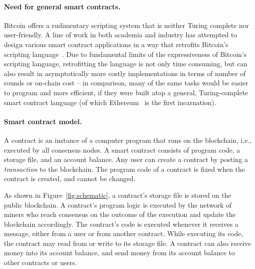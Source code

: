 \documentclass{llncs}
\begin{document}
\paragraph{Need for general smart contracts.}
Bitcoin offers a rudimentary scripting system
that is neither Turing complete nor user-friendly.
A line of work in both academia and industry 
has attempted to design various smart contract
applications in a way that retrofits Bitcoin's 
scripting language~\cite{iddo-lottery,oakland-lottery,liarcoins,micropay}. 
Due to fundamental limits of the expressiveness of Bitcoin's 
scripting language, 
retrofitting the language
is not only time consuming, but can also result
in asymptotically more costly implementations  
in terms of number of rounds or on-chain cost -- in comparison, many of the same tasks
would be easier to program
and more efficient, if they were built atop a general, Turing-complete
smart contract language (of which Ethereum~\cite{ethereum} is 
the first incarnation).




\paragraph{Smart contract model.}
A contract is an instance of a computer program that runs on the blockchain, i.e., executed
by all consensus nodes. A smart contract consists of program code, a storage file, and an account balance.
Any user can create a contract by posting a {\it transaction} to the blockchain.
The program code of a contract is fixed when the contract is created, and cannot be changed.

As shown in Figure~\ref{fig:schematic}, a contract's storage file is stored on the public blockchain.
A contract's program logic is executed by the network of miners 
who reach consensus on the outcome of the execution  
and update the blockchain accordingly.
The contract's code is executed whenever it receives a message, 
either from a user or from another contract.
While executing its code, the contract may read from or write to its storage file.
A contract can also receive money into its account balance, and send money from its account balance to other contracts or users.

\end{document}
